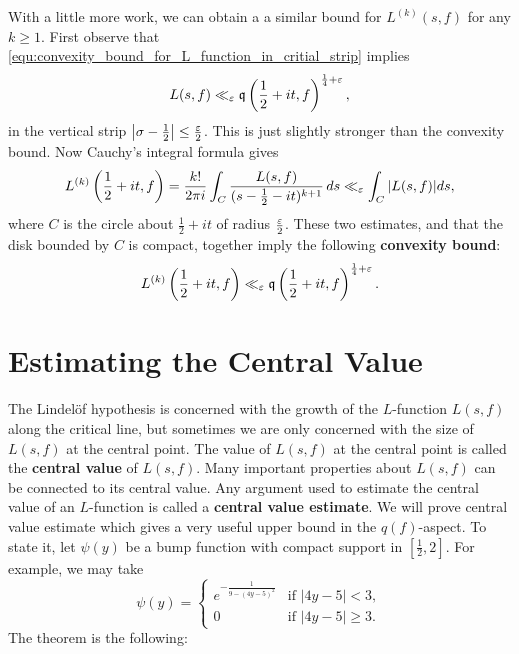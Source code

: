     With a little more work, we can obtain a a similar bound for $L^{(k)}(s,f)$ for any $k \ge 1$. First observe that \cref{equ:convexity_bound_for_L_function_in_critial_strip} implies
    \[
      L(s,f) \ll_{\varepsilon} \mathfrak{q}\left(\frac{1}{2}+it,f\right)^{\frac{1}{4}+\varepsilon},
    \]
    in the vertical strip $\left|\sigma-\frac{1}{2}\right| \le \frac{\varepsilon}{2}$. This is just slightly stronger than the convexity bound. Now Cauchy's integral formula gives
    \[
      L^{(k)}\left(\frac{1}{2}+it,f\right) = \frac{k!}{2\pi i}\int_{C}\frac{L(s,f)}{(s-\frac{1}{2}-it)^{k+1}}\,ds \ll_{\varepsilon} \int_{C}|L(s,f)|ds,
    \]
    where $C$ is the circle about $\frac{1}{2}+it$ of radius $\frac{\varepsilon}{2}$. These two estimates, and that the disk bounded by $C$ is compact, together imply the following \textbf{convexity bound}:
    \[
      L^{(k)}\left(\frac{1}{2}+it,f\right) \ll_{\varepsilon} \mathfrak{q}\left(\frac{1}{2}+it,f\right)^{\frac{1}{4}+\varepsilon}.
    \]
  \section{Estimating the Central Value}
    The Lindel\"of hypothesis is concerned with the growth of the $L$-function $L(s,f)$ along the critical line, but sometimes we are only concerned with the size of $L(s,f)$ at the central point. The value of $L(s,f)$ at the central point is called the \textbf{central value} of $L(s,f)$. Many important properties about $L(s,f)$ can be connected to its central value. Any argument used to estimate the central value of an $L$-function is called a \textbf{central value estimate}. We will prove central value estimate which gives a very useful upper bound in the $q(f)$-aspect. To state it, let $\psi(y)$ be a bump function with compact support in $\left[\frac{1}{2},2\right]$. For example, we may take
    \[
      \psi(y) = \begin{cases} e^{-\frac{1}{9-(4y-5)^{2}}} & \text{if $|4y-5| < 3$}, \\ 0 & \text{if $|4y-5| \ge 3$}. \end{cases}
    \]
    The theorem is the following:

